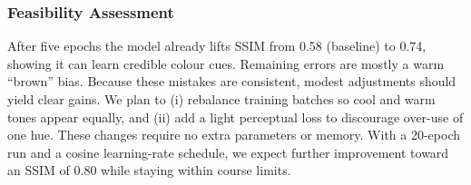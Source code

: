 \documentclass{article} %
\begin{document}
\subsubsection{Feasibility Assessment}

After five epochs the model already lifts SSIM from 0.58 (baseline) to 0.74, showing it can learn credible colour cues. Remaining errors are mostly a warm “brown” bias. Because these mistakes are consistent, modest adjustments should yield clear gains. We plan to (i) rebalance training batches so cool and warm tones appear equally, and (ii) add a light perceptual loss to discourage over-use of one hue. These changes require no extra parameters or memory. With a 20-epoch run and a cosine learning-rate schedule, we expect further improvement toward an SSIM of 0.80 while staying within course limits.

\label{last_page}

\newpage


\end{document}

